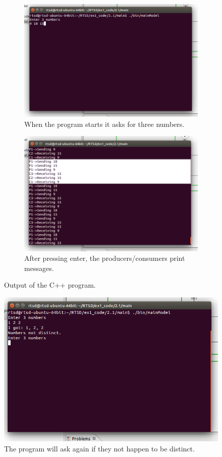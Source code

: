 \documentclass[a4paper,twoside,11pt]{article}
\begin{document}
\begin{figure}
	\begin{subfigure}{0.5\textwidth}
		\centering
		\includegraphics[width=\textwidth]{./images/2-1-output1.png}
		\caption{When the program starts it asks for three numbers.}
	\end{subfigure}
	\begin{subfigure}{0.5\textwidth}
		\centering
		\includegraphics[width=\textwidth]{./images/2-2_output2.png}
		\caption{After pressing enter, the producers/consumers print messages.}
	\end{subfigure}
	\caption{Output of the C++ program.}
	\label{fig:typicalcspoutput}
\end{figure}

\begin{figure}
	\centering
	\includegraphics[width=\textwidth]{./images/2.3-robust.png}
	\caption{The program will ask again if they not happen to be distinct.}
	\label{fig:typicalcspoutputrobust}
\end{figure}
\end{document}
